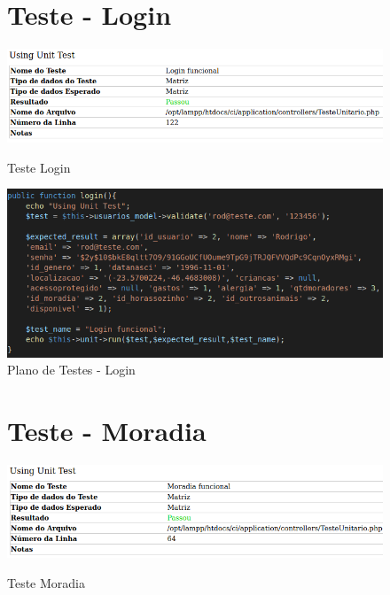 \begin{apendicesenv}
\begin{figure}[!htbp]
\begin{flushleft}
    \section{Teste - Login}
\end{flushleft}
    \centering
    \caption{Teste Login}
    \includegraphics[width=1\textwidth,pagecommand=\chapter{}]{imagens/teste_login.png}
    \label{teste-login}
\end{figure}

\begin{figure}[htb]
    \centering
    \caption{\label{fig_timeline}Plano de Testes - Login}
	\includegraphics[width=1\textwidth]{imagens/cod_teste_login.png}
\end{figure}

\begin{figure}[!htbp]
\begin{flushleft}
    \section{Teste - Moradia}
\end{flushleft}
    \centering
    \caption{Teste Moradia}
    \includegraphics[width=1\textwidth,pagecommand=\chapter{}]{imagens/teste_moradia.png}
    \label{teste-moradia}
\end{figure}


\end{apendicesenv}
